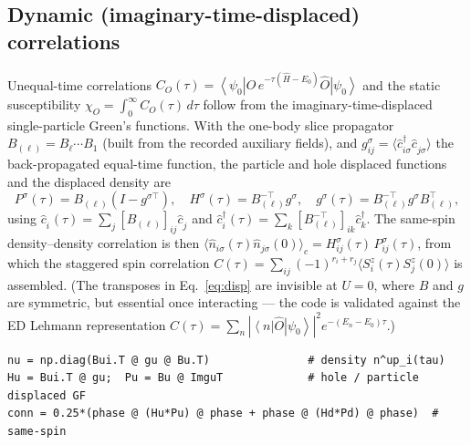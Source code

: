 \documentclass[11pt]{article}
\newcommand{\cre}[1]{\hat{c}^{\dagger}_{#1}}
\newcommand{\ann}[1]{\hat{c}^{\phantom{\dagger}}_{#1}}
\newcommand{\ket}[1]{\left|#1\right\rangle}
\newcommand{\bra}[1]{\left\langle#1\right|}
\begin{document}
\subsection{Dynamic (imaginary-time-displaced) correlations}
Unequal-time correlations $C_O(\tau)=\bra{\psi_0}\hat O\,e^{-\tau(\hat H-E_0)}\hat O
\ket{\psi_0}$ and the static susceptibility $\chi_O=\int_0^\infty\!C_O(\tau)\,d\tau$
follow from the imaginary-time-displaced single-particle Green's functions. With
the one-body slice propagator $B_{(\ell)}=B_\ell\cdots B_1$ (built from the recorded
auxiliary fields), and $g^\sigma_{ij}=\langle\cre{i\sigma}\ann{j\sigma}\rangle$ the
back-propagated equal-time function, the particle and hole displaced functions and
the displaced density are
\begin{equation}
P^\sigma(\tau)=B_{(\ell)}(I-g^{\sigma\top}),\quad
H^\sigma(\tau)=B_{(\ell)}^{-\top} g^\sigma,\quad
g^\sigma(\tau)=B_{(\ell)}^{-\top} g^\sigma B_{(\ell)}^{\top},
\label{eq:disp}
\end{equation}
using $\ann{i}(\tau)=\sum_j[B_{(\ell)}]_{ij}\ann{j}$ and
$\cre{i}(\tau)=\sum_k[B_{(\ell)}^{-\top}]_{ik}\cre{k}$. The same-spin
density--density correlation is then
$\langle \hat n_{i\sigma}(\tau)\hat n_{j\sigma}(0)\rangle_c
= H^\sigma_{ij}(\tau)\,P^\sigma_{ij}(\tau)$, from which the staggered spin
correlation $C(\tau)=\sum_{ij}(-1)^{r_i+r_j}\langle S^z_i(\tau)S^z_j(0)\rangle$ is
assembled. (The transposes in Eq.~\eqref{eq:disp} are invisible at $U=0$, where
$B$ and $g$ are symmetric, but essential once interacting --- the code is
validated against the ED Lehmann representation
$C(\tau)=\sum_n|\bra{n}\hat O\ket{\psi_0}|^2 e^{-(E_n-E_0)\tau}$.)

\begin{lstlisting}[caption={Time-displaced GFs (\texttt{Estimators.chi\_block}).}]
nu = np.diag(Bui.T @ gu @ Bu.T)               # density n^up_i(tau)
Hu = Bui.T @ gu;  Pu = Bu @ ImguT             # hole / particle displaced GF
conn = 0.25*(phase @ (Hu*Pu) @ phase + phase @ (Hd*Pd) @ phase)  # same-spin
\end{lstlisting}
\end{document}
